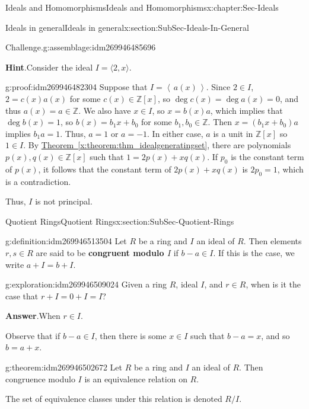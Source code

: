 \documentclass[oneside,10pt,]{book}
\newcommand{\terminology}[1]{\textbf{#1}}
\numberwithin{equation}{section}
\newcommand{\ideal}[1]{\left\langle\, #1 \,\right\rangle}
\def\Z{{\mathbb Z}}
\begin{document}
\begin{chapterptx}{Ideals and Homomorphisms}{}{Ideals and Homomorphisms}{}{}{x:chapter:Sec-Ideals}
\begin{sectionptx}{Ideals in general}{}{Ideals in general}{}{}{x:section:SubSec-Ideals-In-General}
\begin{assemblage}{Challenge.}{g:assemblage:idm269946485696}
\end{assemblage}
\textbf{Hint}.\quad{}Consider the ideal \(I = \langle 2, x \rangle\).%
\begin{proofptx}{}{g:proof:idm269946482304}
Suppose that \(I = \ideal{a(x)}\). Since \(2\in I\), \(2 = c(x) a(x)\) for some \(c(x)\in \Z[x]\), so \(\deg c(x) = \deg a(x) = 0\), and thus \(a(x) = a\in \Z\). We also have \(x\in I\), so \(x = b(x) a\), which implies that \(\deg b(x) = 1\), so \(b(x) = b_1 x + b_0\) for some \(b_1,b_0\in \Z\). Then \(x = (b_1 x + b_0)a\) implies \(b_1 a = 1\). Thus, \(a = 1\) or \(a = -1\). In either case, \(a\) is a unit in \(\Z[x]\) so \(1\in I\). By \hyperref[x:theorem:thm_idealgeneratingset]{Theorem~\ref{x:theorem:thm_idealgeneratingset}}, there are polynomials \(p(x),q(x)\in\Z[x]\) such that \(1 = 2p(x) + xq(x)\). If \(p_0\) is the constant term of \(p(x)\), it follows that the constant term of \(2p(x) + xq(x)\) is \(2p_0 = 1\), which is a contradiction.%
\par
Thus, \(I\) is not principal.%
\end{proofptx}
\end{sectionptx}
%
%
\typeout{************************************************}
\typeout{************************************************}
%
\begin{sectionptx}{Quotient Rings}{}{Quotient Rings}{}{}{x:section:SubSec-Quotient-Rings}
\begin{definition}{}{g:definition:idm269946513504}%
Let \(R\) be a ring and \(I\) an ideal of \(R\). Then elements \(r,s\in R\) are said to be \terminology{congruent modulo \(I\)} if \(b-a\in I\). If this is the case, we write \(a + I = b + I\).%
\end{definition}
\begin{exploration}{}{g:exploration:idm269946509024}%
Given a ring \(R\), ideal \(I\), and \(r\in R\), when is it the case that \(r + I = 0 + I = I\)?%
\par\smallskip%
\noindent\textbf{Answer}.\hypertarget{g:answer:idm269946506192}{}\quad{}When \(r\in I\).%
\end{exploration}
Observe that if \(b-a \in I\), then there is some \(x\in I\) such that \(b-a = x\), and so \(b = a+x\).%
\begin{theorem}{}{}{g:theorem:idm269946502672}%
Let \(R\) be a ring and \(I\) an ideal of \(R\). Then congruence modulo \(I\) is an equivalence relation on \(R\).%
\end{theorem}
The set of equivalence classes under this relation is denoted \(R/I\).%

\end{sectionptx}
\end{chapterptx}
\end{document}
